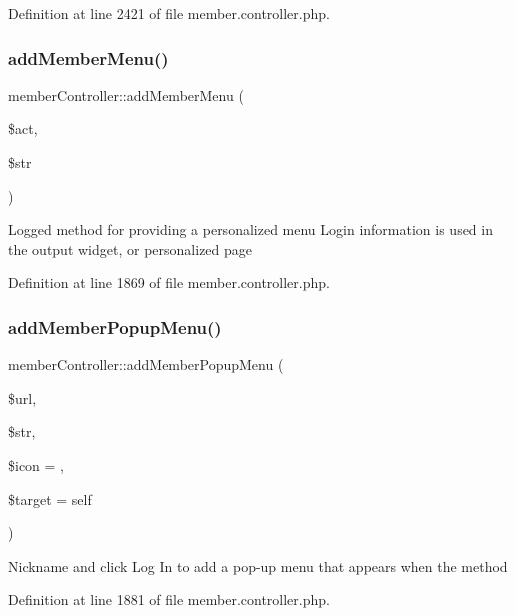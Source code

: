 Definition at line 2421 of file member.\+controller.\+php.

\hypertarget{classmemberController_aaa52725f8ba9ba16cfe4b350a51d7420}{}\label{classmemberController_aaa52725f8ba9ba16cfe4b350a51d7420} 
\subsubsection{\texorpdfstring{add\+Member\+Menu()}{addMemberMenu()}}
{\footnotesize\ttfamily member\+Controller\+::add\+Member\+Menu (\begin{DoxyParamCaption}\item[{}]{\$act,  }\item[{}]{\$str }\end{DoxyParamCaption})}

Logged method for providing a personalized menu Login information is used in the output widget, or personalized page 

Definition at line 1869 of file member.\+controller.\+php.

\hypertarget{classmemberController_a9672e0e43f813d6e791ab62543fc78b0}{}\label{classmemberController_a9672e0e43f813d6e791ab62543fc78b0} 
\subsubsection{\texorpdfstring{add\+Member\+Popup\+Menu()}{addMemberPopupMenu()}}
{\footnotesize\ttfamily member\+Controller\+::add\+Member\+Popup\+Menu (\begin{DoxyParamCaption}\item[{}]{\$url,  }\item[{}]{\$str,  }\item[{}]{\$icon = {\ttfamily \textquotesingle{}\textquotesingle{}},  }\item[{}]{\$target = {\ttfamily \textquotesingle{}self\textquotesingle{}} }\end{DoxyParamCaption})}

Nickname and click Log In to add a pop-\/up menu that appears when the method 

Definition at line 1881 of file member.\+controller.\+php.

